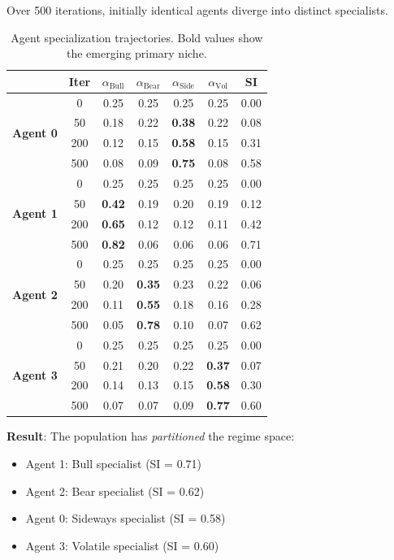 Over 500 iterations, initially identical agents diverge into distinct specialists.

\begin{table}[h]
\centering
\small
\caption{Agent specialization trajectories. Bold values show the emerging primary niche.}
\begin{tabular}{l|c|cccc|c}
\toprule
& \textbf{Iter} & $\alpha_{\text{Bull}}$ & $\alpha_{\text{Bear}}$ & $\alpha_{\text{Side}}$ & $\alpha_{\text{Vol}}$ & \textbf{SI} \\
\midrule
\multirow{4}{*}{\textbf{Agent 0}}
& 0 & 0.25 & 0.25 & 0.25 & 0.25 & 0.00 \\
& 50 & 0.18 & 0.22 & \textbf{0.38} & 0.22 & 0.08 \\
& 200 & 0.12 & 0.15 & \textbf{0.58} & 0.15 & 0.31 \\
& 500 & 0.08 & 0.09 & \textbf{0.75} & 0.08 & 0.58 \\
\midrule
\multirow{4}{*}{\textbf{Agent 1}}
& 0 & 0.25 & 0.25 & 0.25 & 0.25 & 0.00 \\
& 50 & \textbf{0.42} & 0.19 & 0.20 & 0.19 & 0.12 \\
& 200 & \textbf{0.65} & 0.12 & 0.12 & 0.11 & 0.42 \\
& 500 & \textbf{0.82} & 0.06 & 0.06 & 0.06 & 0.71 \\
\midrule
\multirow{4}{*}{\textbf{Agent 2}}
& 0 & 0.25 & 0.25 & 0.25 & 0.25 & 0.00 \\
& 50 & 0.20 & \textbf{0.35} & 0.23 & 0.22 & 0.06 \\
& 200 & 0.11 & \textbf{0.55} & 0.18 & 0.16 & 0.28 \\
& 500 & 0.05 & \textbf{0.78} & 0.10 & 0.07 & 0.62 \\
\midrule
\multirow{4}{*}{\textbf{Agent 3}}
& 0 & 0.25 & 0.25 & 0.25 & 0.25 & 0.00 \\
& 50 & 0.21 & 0.20 & 0.22 & \textbf{0.37} & 0.07 \\
& 200 & 0.14 & 0.13 & 0.15 & \textbf{0.58} & 0.30 \\
& 500 & 0.07 & 0.07 & 0.09 & \textbf{0.77} & 0.60 \\
\bottomrule
\end{tabular}
\label{tab:convergence}
\end{table}

\textbf{Result}: The population has \textit{partitioned} the regime space:
\begin{itemize}
    \item Agent 1: Bull specialist (SI = 0.71)
    \item Agent 2: Bear specialist (SI = 0.62)
    \item Agent 0: Sideways specialist (SI = 0.58)
    \item Agent 3: Volatile specialist (SI = 0.60)
\end{itemize}

